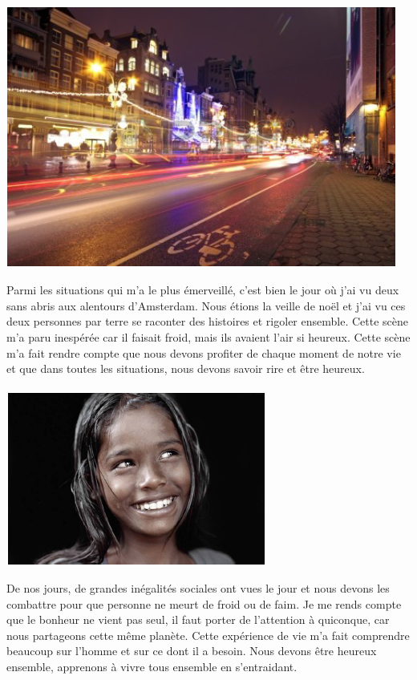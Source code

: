 \paragraph{}
\begin{center}
\includegraphics[scale=0.7]{Amsterdam1.jpg}
\end{center}
Parmi les situations qui m'a le plus émerveillé, c'est bien le jour où j'ai vu deux sans abris aux alentours d'Amsterdam.
Nous étions la veille de noël et j'ai vu ces deux personnes par terre se raconter des histoires et rigoler ensemble. Cette scène m'a paru inespérée car il faisait froid, mais ils avaient l'air si heureux.
Cette scène m'a fait rendre compte que nous devons profiter de chaque moment de notre vie et que dans toutes les situations, nous devons savoir rire et être heureux.

\paragraph{}
\begin{center}
\includegraphics[scale=0.7]{Amsterdam2.jpg}
\end{center}
De nos jours, de grandes inégalités sociales ont vues le jour et nous devons les combattre pour que personne ne meurt de froid ou de faim. Je me rends compte que le bonheur ne vient pas seul, il faut porter de l'attention à quiconque, car nous partageons cette même planète.
Cette expérience de vie m'a fait comprendre beaucoup sur l'homme et sur ce dont il a besoin. Nous devons être heureux ensemble, apprenons à vivre tous ensemble en s'entraidant.

